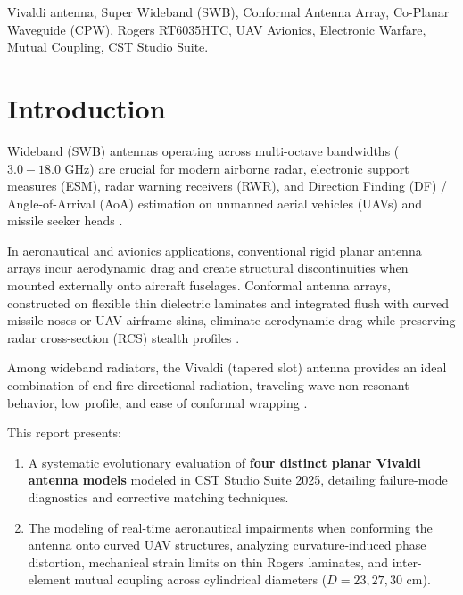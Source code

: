 \documentclass[journal,compsoc,twocolumn,10pt]{IEEEtran}
\begin{document}
\begin{IEEEkeywords}
Vivaldi antenna, Super Wideband (SWB), Conformal Antenna Array, Co-Planar Waveguide (CPW), Rogers RT6035HTC, UAV Avionics, Electronic Warfare, Mutual Coupling, CST Studio Suite.
\end{IEEEkeywords}

\section{Introduction}
 Wideband (SWB) antennas operating across multi-octave bandwidths ($3.0 - 18.0\text{ GHz}$) are crucial for modern airborne radar, electronic support measures (ESM), radar warning receivers (RWR), and Direction Finding (DF) / Angle-of-Arrival (AoA) estimation on unmanned aerial vehicles (UAVs) and missile seeker heads \cite{gibson1979vivaldi, balanis2005antenna}.

In aeronautical and avionics applications, conventional rigid planar antenna arrays incur aerodynamic drag and create structural discontinuities when mounted externally onto aircraft fuselages. Conformal antenna arrays, constructed on flexible thin dielectric laminates and integrated flush with curved missile noses or UAV airframe skins, eliminate aerodynamic drag while preserving radar cross-section (RCS) stealth profiles \cite{joshi2025compact}.

Among wideband radiators, the Vivaldi (tapered slot) antenna provides an ideal combination of end-fire directional radiation, traveling-wave non-resonant behavior, low profile, and ease of conformal wrapping \cite{paul2021super, yazdandoost2004ultra}. 

This report presents:
\begin{enumerate}
    \item A systematic evolutionary evaluation of \textbf{four distinct planar Vivaldi antenna models} modeled in CST Studio Suite 2025, detailing failure-mode diagnostics and corrective matching techniques.
    \item The modeling of real-time aeronautical impairments when conforming the antenna onto curved UAV structures, analyzing curvature-induced phase distortion, mechanical strain limits on thin Rogers laminates, and inter-element mutual coupling across cylindrical diameters ($D = 23, 27, 30\text{ cm}$).
\end{enumerate}
\end{document}
